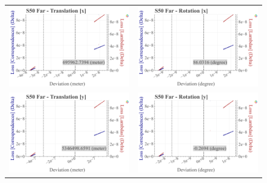 \begin{figure}[!ht]
  \centering
  \begin{tabular}{cc}
    \includegraphics[width=0.45 \linewidth]{diagrams/calibration/s50_s_far/parameters.csv/Translation[x]_vs_Loss[Correspondences]_vs_Loss[Lambdas]_cluster_All.png} &
    \includegraphics[width=0.45 \linewidth]{diagrams/calibration/s50_s_far/parameters.csv/Rotation[x]_vs_Loss[Correspondences]_vs_Loss[Lambdas]_cluster_All.png} \\
    
    \includegraphics[width=0.45 \linewidth]{diagrams/calibration/s50_s_far/parameters.csv/Translation[y]_vs_Loss[Correspondences]_vs_Loss[Lambdas]_cluster_All.png} &
    \includegraphics[width=0.45 \linewidth]{diagrams/calibration/s50_s_far/parameters.csv/Rotation[y]_vs_Loss[Correspondences]_vs_Loss[Lambdas]_cluster_All.png} \\
    

\end{tabular}
\end{figure}
